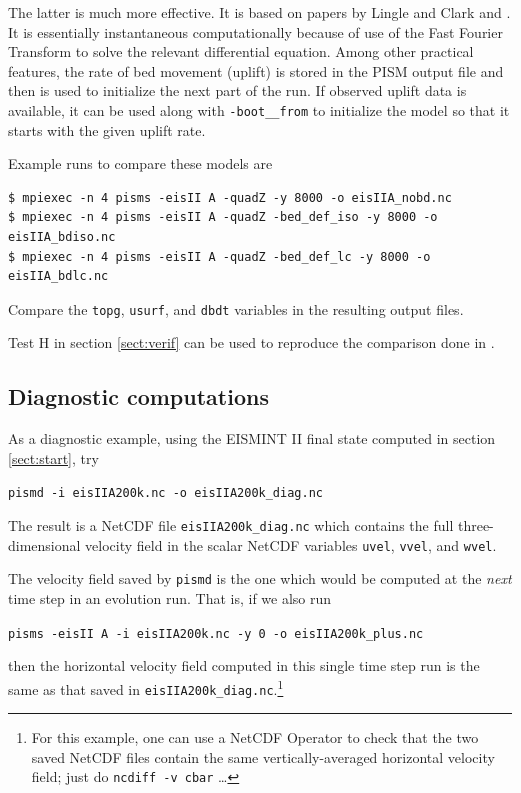 \documentclass[11pt,final]{amsart}
\renewcommand{\t}[1]{\texttt{#1}}
\newcommand{\und}{\_\!\_}
\newcommand{\pismoptionindex}[1]{\index{options for PISM (and PETSc)!\texttt{-#1}}}
\newcommand{\intextoption}[1]{\texttt{-#1}\pismoptionindex{#1}}
\begin{document}
The latter is much more effective.  It is based on papers by Lingle and Clark \cite{LingleClark}  and \cite{BLKfastearth}.  It is essentially instantaneous computationally because of use of the Fast Fourier Transform to solve the relevant differential equation.  Among other practical features, the rate of bed movement (uplift) is stored in the PISM output file and then is used to initialize the next part of the run.  If observed uplift data is available, it can be used along with \intextoption{boot\und from} to initialize the model so that it starts with the given uplift rate.

Example runs to compare these models are
\begin{verbatim}
$ mpiexec -n 4 pisms -eisII A -quadZ -y 8000 -o eisIIA_nobd.nc
$ mpiexec -n 4 pisms -eisII A -quadZ -bed_def_iso -y 8000 -o eisIIA_bdiso.nc
$ mpiexec -n 4 pisms -eisII A -quadZ -bed_def_lc -y 8000 -o eisIIA_bdlc.nc
\end{verbatim}
Compare the \verb|topg|, \verb|usurf|, and \verb|dbdt| variables in the resulting output files.

Test H in section \ref{sect:verif} can be used to reproduce the comparison done in \cite{BLKfastearth}.


\subsection{Diagnostic computations}  As a diagnostic example, using the EISMINT II final state computed in section \ref{sect:start}, try

\verb|pismd -i eisIIA200k.nc -o eisIIA200k_diag.nc|

\noindent The result is a NetCDF file \verb|eisIIA200k_diag.nc| which contains the full three-dimensional velocity field in the scalar NetCDF variables \verb|uvel|, \verb|vvel|, and \verb|wvel|.

The velocity field saved by \verb|pismd| is the one which would be computed at the \emph{next} time step in an evolution run.  That is, if we also run

\verb|pisms -eisII A -i eisIIA200k.nc -y 0 -o eisIIA200k_plus.nc|

\noindent then the horizontal velocity field computed in this single time step run is the same as that saved in \verb|eisIIA200k_diag.nc|.\footnote{For this example, one can use a NetCDF Operator to check that the two saved NetCDF files contain the same vertically-averaged horizontal velocity field; just do \t{ncdiff -v cbar} \dots}
\end{document}
